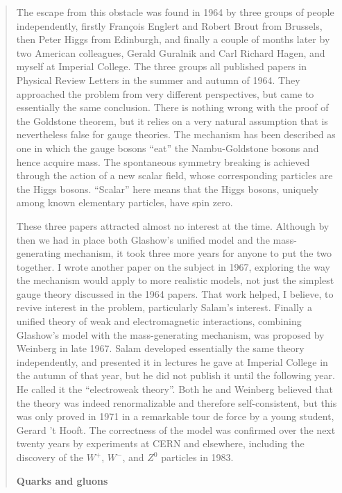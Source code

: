 \begin{quote}
The escape from this obstacle was found in 1964 by three groups of people independently, firstly François Englert and Robert Brout from Brussels, then Peter Higgs from Edinburgh, and finally a couple of months later by two American colleagues, Gerald Guralnik and Carl Richard Hagen, and myself at Imperial College. The three groups all published papers in Physical Review Letters in the summer and autumn of 1964. They approached the problem from very different perspectives, but came to essentially the same conclusion. There is nothing wrong with the proof of the Goldstone theorem, but it relies on a very natural assumption that is nevertheless false for gauge theories. The mechanism has been described as one in which the gauge bosons “eat” the Nambu-Goldstone bosons and hence acquire mass. The spontaneous symmetry breaking is achieved through the action of a new scalar field, whose corresponding particles are the Higgs bosons. “Scalar” here means that the Higgs bosons, uniquely among known elementary particles, have spin zero.

These three papers attracted almost no interest at the time. Although by then we had in place both Glashow’s unified model and the mass-generating mechanism, it took three more years for anyone to put the two together. I wrote another paper on the subject in 1967, exploring the way the mechanism would apply to more realistic models, not just the simplest gauge theory discussed in the 1964 papers. That work helped, I believe, to revive interest in the problem, particularly Salam’s interest. Finally a unified theory of weak and electromagnetic interactions, combining Glashow’s model with the mass-generating mechanism, was proposed by Weinberg in late 1967. Salam developed essentially the same theory independently, and presented it in lectures he gave at Imperial College in the autumn of that year, but he did not publish it until the following year. He called it the “electroweak theory”. Both he and Weinberg believed that the theory was indeed renormalizable and therefore self-consistent, but this was only proved in 1971 in a remarkable tour de force by a young student, Gerard ’t Hooft. The correctness of the model was confirmed over the next twenty years by experiments at CERN and elsewhere, including the discovery of the $W^+$, $W^-$, and $Z^0$ particles in 1983.

\textbf{Quarks and gluons}


\end{quote}
